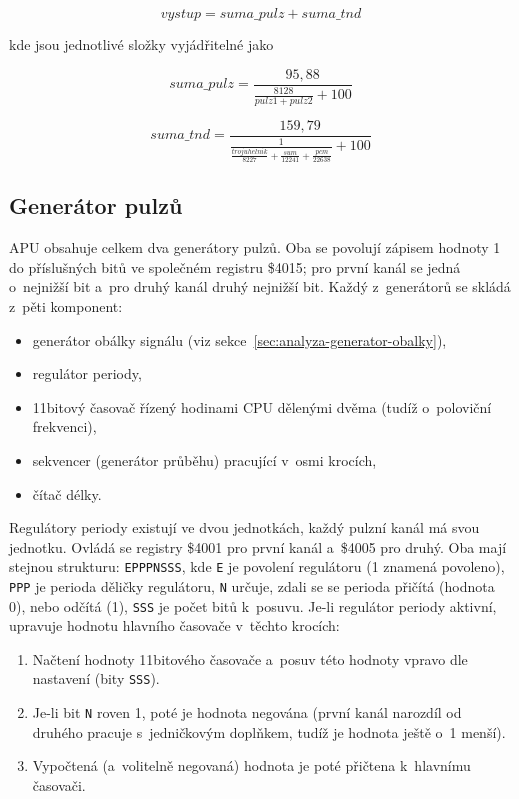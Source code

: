 \[vystup = suma\_pulz + suma\_tnd\]
	
kde jsou jednotlivé složky vyjádřitelné jako
	
\[suma\_pulz = \frac{95,88}{\frac{8128}{pulz1 + pulz2} + 100}\]

\[suma\_tnd = \frac{159,79}{\frac{1}{\frac{trojuhelnik}{8227} + \frac{sum}{12241} + \frac{pcm}{22638}} + 100}\]

\subsection{Generátor pulzů}
APU obsahuje celkem dva generátory pulzů. Oba se povolují zápisem hodnoty 1 do příslušných bitů ve společném registru \$4015; pro první kanál se jedná o~nejnižší bit a~pro druhý kanál druhý nejnižší bit. Každý z~generátorů se skládá z~pěti komponent:
\begin{itemize}
	\item generátor obálky signálu (viz sekce~\ref{sec:analyza-generator-obalky}),
	\item regulátor periody,
	\item 11bitový časovač řízený hodinami CPU dělenými dvěma (tudíž o~poloviční frekvenci),
	\item sekvencer (generátor průběhu) pracující v~osmi krocích,
	\item čítač délky.
\end{itemize}

Regulátory periody existují ve dvou jednotkách, každý pulzní kanál má svou jednotku. Ovládá se registry \$4001 pro první kanál a~\$4005 pro druhý. Oba mají stejnou strukturu: \texttt{EPPPNSSS}, kde \texttt{E} je povolení regulátoru (1 znamená povoleno), \texttt{PPP} je perioda děličky regulátoru, \texttt{N} určuje, zdali se se perioda přičítá (hodnota 0), nebo odčítá (1), \texttt{SSS} je počet bitů k~posuvu. Je-li regulátor periody aktivní, upravuje hodnotu hlavního časovače v~těchto krocích:
\begin{enumerate}
	\item Načtení hodnoty 11bitového časovače a~posuv této hodnoty vpravo dle nastavení (bity \texttt{SSS}).
	\item Je-li bit \texttt{N} roven 1, poté je hodnota negována (první kanál narozdíl od druhého pracuje s~jedničkovým doplňkem, tudíž je hodnota ještě o~1 menší).
	\item Vypočtená (a~volitelně negovaná) hodnota je poté přičtena k~hlavnímu časovači.
\end{enumerate}

